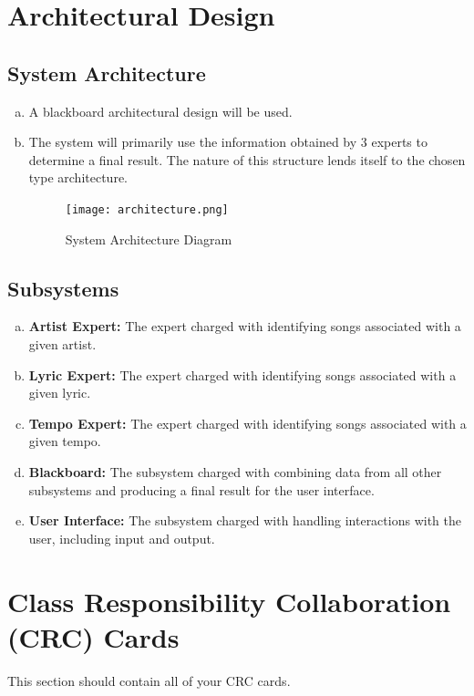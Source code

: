 \documentclass[]{article}
\begin{document}
\section{Architectural Design}
\label{sec:architectural_design}

\subsection{System Architecture}
\label{sub:system_architecture}
\begin{enumerate}[a)]
	\item A blackboard architectural design will be used.
	\item The system will primarily use the information obtained by 3 experts to determine a final result. The nature of this structure lends itself to the chosen type architecture.
\begin{figure}[H]
	\centering
	\texttt{[image: architecture.png]}
	\caption{System Architecture Diagram}
\end{figure}
\end{enumerate}

\subsection{Subsystems}
\label{sub:subsystems}
\begin{enumerate}[a)]
	\item \textbf{Artist Expert:} The expert charged with identifying songs associated with a given artist.
	\item \textbf{Lyric Expert:} The expert charged with identifying songs associated with a given lyric.
	\item \textbf{Tempo Expert:} The expert charged with identifying songs associated with a given tempo.
	\item \textbf{Blackboard:} The subsystem charged with combining data from all other subsystems and producing a final result for the user interface.
	\item \textbf{User Interface:} The subsystem charged with handling interactions with the user, including input and output.
\end{enumerate}

	
\section{Class Responsibility Collaboration (CRC) Cards}
\label{sec:class_responsibility_collaboration_crc_cards}
This section should contain all of your CRC cards.
\end{document}
